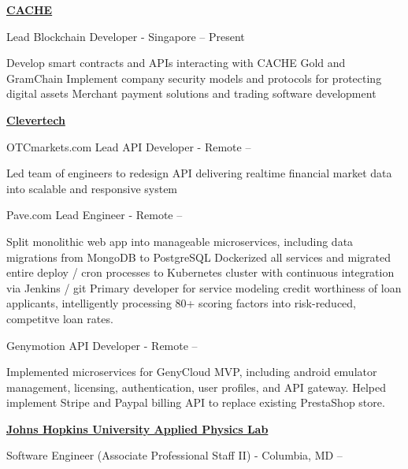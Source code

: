 \documentclass[a4paper,10pt,oneside]{article}
\begin{document}
\begin{minipage}[t][0pt]{\linewidth}
\begin{body}
\EntryGap

\href{https://cache.gold}
{\textbf{CACHE}}
\par
Lead Blockchain Developer - Singapore
\hfill
{} -- Present
\begin{detail}
\BulletItem Develop smart contracts and APIs interacting with CACHE Gold and GramChain
\BulletItem Implement company security models and protocols for protecting digital assets
\BulletItem Merchant payment solutions and trading software development
\end{detail}

\EntryGap

\href{http://www.clevertech.biz/}
{\textbf{Clevertech}}
\par
OTCmarkets.com Lead API Developer - Remote
\hfill
{} -- 
\begin{detail}
\BulletItem Led team of engineers to redesign API delivering realtime financial market data into scalable and responsive system
\end{detail}

\par
Pave.com Lead Engineer - Remote
\hfill
{} -- 
\begin{detail}
\BulletItem Split monolithic web app into manageable microservices, including data migrations from MongoDB to PostgreSQL
\BulletItem Dockerized all services and migrated entire deploy / cron processes to Kubernetes cluster with continuous integration via Jenkins / git
\BulletItem Primary developer for service modeling credit worthiness of loan applicants, intelligently processing 80+ scoring factors into risk-reduced, competitve loan rates.
\end{detail}

\par
Genymotion API Developer - Remote
\hfill
{} -- 
\begin{detail}
\BulletItem Implemented microservices for GenyCloud MVP, including android emulator management, licensing, authentication, user profiles, and API gateway.
\BulletItem Helped implement Stripe and Paypal billing API to replace existing PrestaShop store.
\end{detail}

\EntryGap

\href{http://www.jhuapl.edu/}
{\textbf{Johns Hopkins University Applied Physics Lab}}
\par
Software Engineer (Associate Professional Staff II) - Columbia, MD
\hfill
{} --
\begin{detail}


\end{detail}
\end{body}
\end{minipage}
\end{document}
